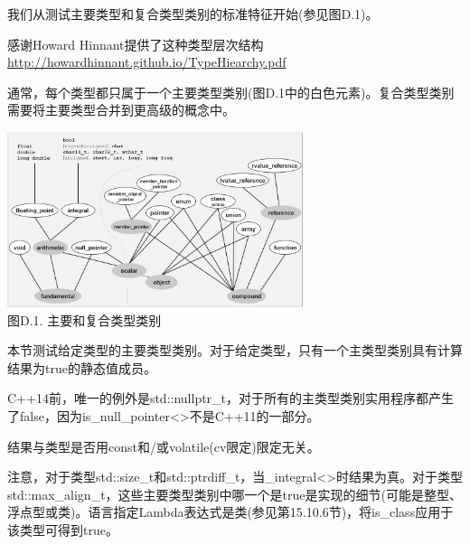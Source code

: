 
我们从测试主要类型和复合类型类别的标准特征开始(参见图D.1)。

\begin{tcolorbox}[colback=webgreen!5!white,colframe=webgreen!75!black]
\hspace*{0.75cm}感谢Howard Hinnant提供了这种类型层次结构\url{http://howardhinnant.github.io/TypeHiearchy.pdf}
\end{tcolorbox}

通常，每个类型都只属于一个主要类型类别(图D.1中的白色元素)。复合类型类别需要将主要类型合并到更高级的概念中。

\begin{center}
\includegraphics[width=0.65\textwidth]{content/Appendix/D/images/1.png} \\
图D.1. 主要和复合类型类别
\end{center}


本节测试给定类型的主要类型类别。对于给定类型，只有一个主类型类别具有计算结果为true的静态值成员。

\begin{tcolorbox}[colback=webgreen!5!white,colframe=webgreen!75!black]
\hspace*{0.75cm}C++14前，唯一的例外是std::nullptr\_t，对于所有的主类型类别实用程序都产生了false，因为is\_null\_pointer<>不是C++11的一部分。
\end{tcolorbox}

结果与类型是否用const和/或volatile(cv限定)限定无关。

注意，对于类型std::size\_t和std::ptrdiff\_t，当\_integral<>时结果为真。对于类型std::max\_align\_t，这些主要类型类别中哪一个是true是实现的细节(可能是整型、浮点型或类)。语言指定Lambda表达式是类(参见第15.10.6节)，将is\_class应用于该类型可得到true。

